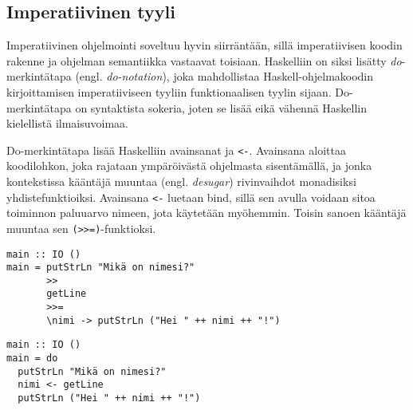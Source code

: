 \documentclass[finnish]{tktltiki2}
\begin{document}


\subsection{Imperatiivinen tyyli}

Imperatiivinen ohjelmointi soveltuu hyvin siirräntään, sillä imperatiivisen koodin rakenne ja
ohjelman semantiikka vastaavat toisiaan. Haskelliin on siksi lisätty \emph{do}-merkintätapa (engl.
\emph{do-notation}), joka mahdollistaa Haskell-ohjelmakoodin kirjoittamisen imperatiiviseen tyyliin
funktionaalisen tyylin sijaan. Do-merkintätapa on syntaktista sokeria, joten se lisää eikä vähennä
Haskellin kielellistä ilmaisuvoimaa.

Do-merkintätapa lisää Haskelliin avainsanat  ja \verb|<-|. Avainsana  aloittaa
koodilohkon, joka rajataan ympäröivästä ohjelmasta sisentämällä, ja jonka kontekstissa kääntäjä
muuntaa (engl. \emph{desugar}) rivinvaihdot monadisiksi yhdistefunktioiksi. Avainsana \verb|<-|
luetaan bind, sillä sen avulla voidaan sitoa toiminnon paluuarvo nimeen, jota käytetään myöhemmin.
Toisin sanoen kääntäjä muuntaa sen \verb|(>>=)|-funktioksi.

\begin{lstlisting}[float,label={lst:desugared},caption={Funktionaalinen tyyli}]
main :: IO ()
main = putStrLn "Mikä on nimesi?"
       >>
       getLine
       >>=
       \nimi -> putStrLn ("Hei " ++ nimi ++ "!")
\end{lstlisting}

\begin{lstlisting}[float,label={lst:donotation},caption={Imperatiivinen tyyli ja do-merkintätapa}]
main :: IO ()
main = do
  putStrLn "Mikä on nimesi?"
  nimi <- getLine
  putStrLn ("Hei " ++ nimi ++ "!")
\end{lstlisting}
\end{document}
